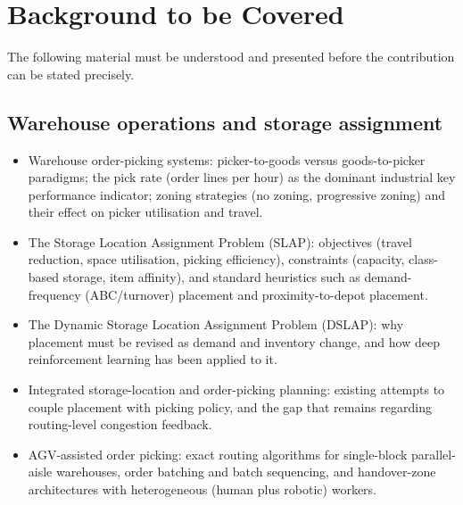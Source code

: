 \section{Background to be Covered}

The following material must be understood and presented before the
contribution can be stated precisely.

\subsection{Warehouse operations and storage assignment}
\begin{itemize}
  \item Warehouse order-picking systems: picker-to-goods versus
        goods-to-picker paradigms; the pick rate (order lines per hour) as
        the dominant industrial key performance indicator; zoning strategies
        (no zoning, progressive zoning) and their effect on picker
        utilisation and travel.
  \item The Storage Location Assignment Problem (SLAP): objectives (travel
        reduction, space utilisation, picking efficiency), constraints
        (capacity, class-based storage, item affinity), and standard
        heuristics such as demand-frequency (ABC/turnover) placement and
        proximity-to-depot placement.
  \item The Dynamic Storage Location Assignment Problem (DSLAP): why
        placement must be revised as demand and inventory change, and how
        deep reinforcement learning has been applied to it.
  \item Integrated storage-location and order-picking planning: existing
        attempts to couple placement with picking policy, and the gap that
        remains regarding routing-level congestion feedback.
  \item AGV-assisted order picking: exact routing algorithms for
        single-block parallel-aisle warehouses, order batching and batch
        sequencing, and handover-zone architectures with heterogeneous
        (human plus robotic) workers.
\end{itemize}

